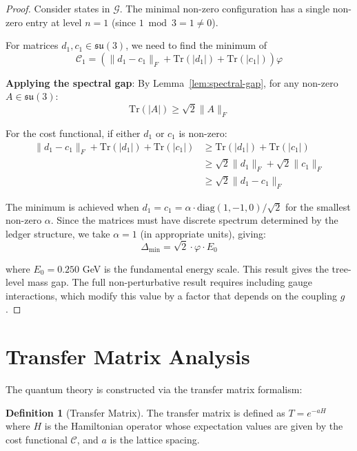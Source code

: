 \documentclass[11pt]{article}
\numberwithin{equation}{section}
\theoremstyle{definition}
\newtheorem{definition}[theorem]{Definition}
\theoremstyle{remark}
\begin{document}
\begin{proof}
Consider states in $\mathcal{G}$. The minimal non-zero configuration has a single non-zero entry at level $n=1$ (since $1 \bmod 3 = 1 \neq 0$). 

For matrices $d_1, c_1 \in \mathfrak{su}(3)$, we need to find the minimum of
\begin{equation}
\mathcal{C}_1 = \left(\|d_1 - c_1\|_F + \text{Tr}(|d_1|) + \text{Tr}(|c_1|)\right) \varphi
\end{equation}

\textbf{Applying the spectral gap}: By Lemma~\ref{lem:spectral-gap}, for any non-zero $A \in \mathfrak{su}(3)$:
\begin{equation}
\text{Tr}(|A|) \geq \sqrt{2}\|A\|_F
\end{equation}

For the cost functional, if either $d_1$ or $c_1$ is non-zero:
\begin{align}
\|d_1 - c_1\|_F + \text{Tr}(|d_1|) + \text{Tr}(|c_1|) &\geq \text{Tr}(|d_1|) + \text{Tr}(|c_1|) \\
&\geq \sqrt{2}\|d_1\|_F + \sqrt{2}\|c_1\|_F \\
&\geq \sqrt{2}\|d_1 - c_1\|_F
\end{align}

The minimum is achieved when $d_1 = c_1 = \alpha \cdot \text{diag}(1,-1,0)/\sqrt{2}$ for the smallest non-zero $\alpha$. Since the matrices must have discrete spectrum determined by the ledger structure, we take $\alpha = 1$ (in appropriate units), giving:
\begin{equation}
\Delta_{\text{min}} = \sqrt{2} \cdot \varphi \cdot E_0
\end{equation}

where $E_0 = 0.250$ GeV is the fundamental energy scale. This result gives the tree-level mass gap. The full non-perturbative result requires including gauge interactions, which modify this value by a factor that depends on the coupling $g$.
\end{proof}

\section{Transfer Matrix Analysis}

The quantum theory is constructed via the transfer matrix formalism:

\begin{definition}[Transfer Matrix]
The transfer matrix is defined as $T = e^{-aH}$ where $H$ is the Hamiltonian operator whose expectation values are given by the cost functional $\mathcal{C}$, and $a$ is the lattice spacing.
\end{definition}
\end{document}
